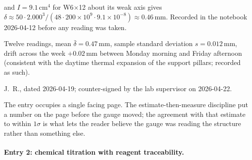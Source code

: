 \begin{description}[leftmargin=2em, itemsep=2pt]
    and $I = 9.1 \,\si{\centi\meter}^4$ for W6$\times$12 about its
    weak axis gives $\delta \approx 50 \cdot 2.000^3 /
    (48 \cdot 200 \times 10^9 \cdot 9.1 \times 10^{-8}) \approx
    0.46 \,\si{\milli\meter}$. Recorded in the notebook 2026-04-12
    before any reading was taken.
  \item[Reading.] Twelve readings, mean
    $\bar\delta = 0.47 \,\si{\milli\meter}$, sample standard
    deviation $s = 0.012 \,\si{\milli\meter}$, drift across the week
    $+0.02 \,\si{\milli\meter}$ between Monday morning and Friday
    afternoon (consistent with the daytime thermal expansion of the
    support pillars; recorded as such).
  \item[Signature.] J.~R., dated 2026-04-19; counter-signed by the
    lab supervisor on 2026-04-22.
\end{description}

The entry occupies a single facing page. The estimate-then-measure
discipline put a number on the page before the gauge moved; the
agreement with that estimate to within $1\sigma$ is what lets the
reader believe the gauge was reading the structure rather than
something else.

\paragraph{Entry 2: chemical titration with reagent traceability.}

